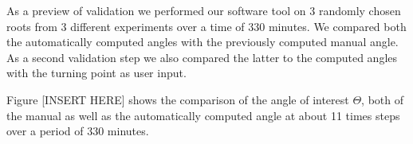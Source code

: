 As a preview of validation we performed our software tool on 3 randomly chosen roots from 3 different experiments over a time of 330 minutes. We compared both the automatically computed angles with the previously computed manual angle. As a second validation step we also compared the latter to the computed angles with the turning point as user input.

Figure [INSERT HERE] shows the comparison of the angle of interest \( \Theta \), both of the manual as well as the automatically computed angle at about 11 times steps over a period of 330 minutes.




